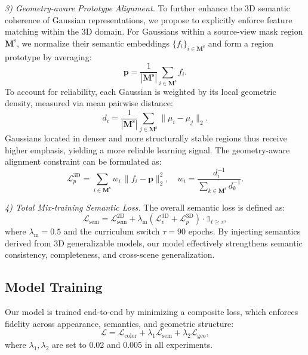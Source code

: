\documentclass[runningheads]{llncs}
\begin{document}
\noindent
\textit{3) Geometry-aware Prototype Alignment.} 
To further enhance the 3D semantic coherence of Gaussian representations, we propose to explicitly enforce feature matching within the 3D domain. 
For Gaussians within a source-view mask region $\mathbf{M}^{\text{s}}$, we normalize their semantic embeddings $\{ {f}_i \}_{i\in \mathbf{M}^{\text{s}}}$ and form a region prototype by averaging: 
\begin{equation}
\mathbf{p} = \frac{1}{|\mathbf{M}^{\text{s}}|}\sum_{i\in \mathbf{M}^{\text{s}}} {f}_i.
\end{equation}
To account for reliability, each Gaussian is weighted by its local geometric density, measured via mean pairwise distance:
\begin{equation}
d_i = \frac{1}{|\mathbf{M}^{\text{s}}|}\sum_{j\in \mathbf{M}^{\text{s}}}\|\mu_i - \mu_j\|_2. 
\end{equation}
Gaussians located in denser and more structurally stable regions thus receive higher emphasis, yielding a more reliable learning signal. The geometry-aware alignment constraint can be formulated as:
\begin{equation}
\mathcal{L}^{\text{3D}}_p = \sum_{i\in \mathbf{M}^{\text{s}}} w_i \, \big\| {f}_i - \mathbf{p} \big\|_2^2, 
\quad w_i = \frac{d_i^{-1}}{\sum_{k\in \mathbf{M}^{\text{s}}} d_k^{-1}}. 
\end{equation}



\noindent
\textit{4) Total Mix-training Semantic Loss.} 
The overall semantic loss is defined as: 
\begin{equation}
\mathcal{L}_{\text{sem}} = \mathcal{L}_{\text{sem}}^{\text{2D}} + \lambda_{\text{m}}(\mathcal{L}^{\text{3D}}_v + \mathcal{L}^{\text{3D}}_p) \cdot \mathds{1}_{t \geq \tau},
\label{eq:total_sem_loss}
\end{equation}
where $\lambda_{\text{m}}=0.5$ and the curriculum switch $\tau=90$ epochs.  
By injecting semantics derived from 3D generalizable models, our model effectively strengthens semantic consistency, completeness, and cross-scene generalization. 



\subsection{Model Training}  \label{sec:training}
Our model is trained end-to-end by minimizing a composite loss, which enforces fidelity across appearance, semantics, and geometric structure: 
\begin{equation}
\mathcal{L} = \mathcal{L}_{\text{color}} + \lambda_1\mathcal{L}_{\text{sem}} + \lambda_2 \mathcal{L}_{\text{geo}}, 
\end{equation}
where $\lambda_1, \lambda_2$ are set to 0.02 and 0.005  in all experiments.
\end{document}

